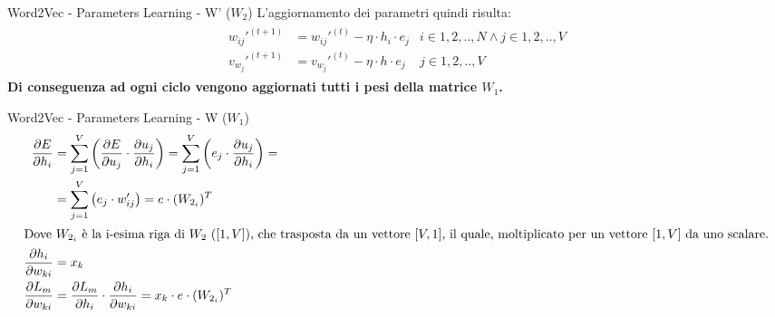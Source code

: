 \documentclass[british]{beamer}
\begin{document}
\begin{frame}{Word2Vec - Parameters Learning - W' (\(W_2\))}
	L'aggiornamento dei parametri quindi risulta:
	\begin{gather*}
		\begin{align*}
		w_{ij}'^{(t+1)} &= w_{ij}'^{(t)} - \eta\cdot h_i \cdot e_j &\mathit{i} \in {1,2,..,N} \wedge \mathit{j} \in {1,2,..,V}
		\\
		v_{w_{j}}'^{(t+1)} &= v_{w_{j}}'^{(t)} - \eta\cdot h \cdot e_j &\mathit{j} \in {1,2,..,V}
		\end{align*} 
	\end{gather*}
	\textbf{Di conseguenza ad ogni ciclo vengono aggiornati tutti i pesi della matrice \(W_1\).}
\end{frame}

\begin{frame}{Word2Vec - Parameters Learning - W (\(W_1\))}
	\begin{gather*}
		\begin{split}
		\frac{\partial E}{\partial h_i} &= \sum_{j=1}^{V} \left(\frac{\partial E}{\partial u_j} \cdot \frac{\partial u_j}{\partial h_i}\right) = 
		\sum_{j=1}^{V} \left(e_j \cdot \frac{\partial u_j}{\partial h_i}\right) = 		\\
		&= \sum_{j=1}^{V} \left(e_j \cdot w_{ij}'\right) =
		e \cdot (W_{2_{i}})^T
		\\
		\intertext{Dove \(W_{2_{i}}\) \`{e} la i-esima riga di \(W_2\) (\([1,V]\)), che trasposta da un vettore \([V,1]\), il quale, moltiplicato per un vettore \([1,V]\) da uno scalare.}
		\frac{\partial h_i}{\partial w_{ki}} &= x_k
		\\
		\frac{\partial L_m}{\partial w_{ki}} &= \frac{\partial L_m}{\partial h_i} \cdot \frac{\partial h_i}{\partial w_{ki}} = x_k \cdot e \cdot (W_{2_{i}})^T
		\end{split}
	\end{gather*}
\end{frame}
\end{document}
